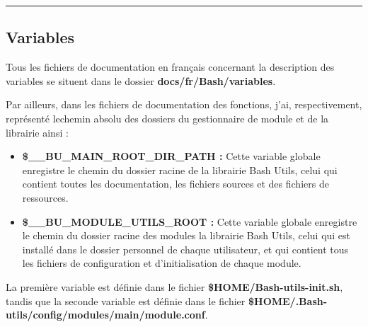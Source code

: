 \documentclass[a4paper,10pt]{article}
\begin{document}



\color{green}\par\noindent\rule{\textwidth}{0.4pt}\color{white}

\color{green}
\subsection{Variables}\color{white}

\begin{justify}
    Tous les fichiers de documentation en français concernant la description des variables se situent dans le dossier \textbf{\color{lime}docs/fr/Bash/variables}.
\end{justify}


\begin{justify}
    Par ailleurs, dans les fichiers de documentation des fonctions, j'ai, respectivement, représenté le\linebreak chemin absolu des dossiers du gestionnaire de module et de la librairie ainsi :

    \begin{itemize}
        \item \textbf{\color{orange}\$\_\_BU\_MAIN\_ROOT\_DIR\_PATH\color{white} :} Cette variable globale enregistre le chemin du dossier racine de la librairie Bash Utils, celui qui contient toutes les documentation, les fichiers sources et des fichiers de ressources.\\

        \item \textbf{\color{orange}\$\_\_BU\_MODULE\_UTILS\_ROOT\color{white} :} Cette variable globale enregistre le chemin du dossier racine des modules la librairie Bash Utils, celui qui est installé dans le dossier personnel de chaque utilisateur, et qui contient tous les fichiers de configuration et d'initialisation de chaque module.
    \end{itemize}
\end{justify}



\begin{justify}
    La première variable est définie dans le fichier \textbf{\color{orange}\$HOME\color{lime}/Bash-utils-init.sh}, tandis que la seconde variable est définie dans le fichier \textbf{\color{orange}\$HOME\color{lime}/.Bash-utils/config/modules/main/module.conf}.
\end{justify}
\end{document}

